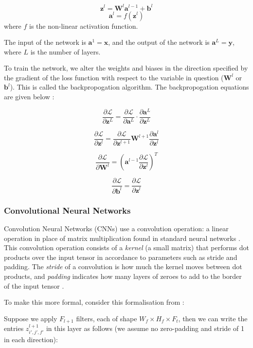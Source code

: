 \[
\boldsymbol{z}^l = \boldsymbol{W}^l \boldsymbol{a}^{l-1} + \boldsymbol{b}^l
\]
\[
\boldsymbol{a}^{l} = f(\boldsymbol{z}^{l})
\]
where $f$ is the non-linear activation function.

The input of the network is $\boldsymbol{a}^1 = \boldsymbol{x}$, and the output of the network is $\boldsymbol{a}^L = \boldsymbol{y}$, where $L$ is the number of layers.

To train the network, we alter the weights and biases in the direction specified by the gradient of the loss function with respect to the variable in question ($\boldsymbol{W}^l$ or $\boldsymbol{b}^l$). This is called the backpropogation algorithm. The backpropogation equations are given below \cite{csmlnotes}:

\[\frac{\partial \mathcal{L}}{\partial \boldsymbol{z}^L} =\frac{\partial \mathcal{L}}{\partial \boldsymbol{a}^L} \cdot \frac{\partial \boldsymbol{a}^L}{\partial \boldsymbol{z}^L}\]

\[\frac{\partial \mathcal{L}}{\partial \boldsymbol{z}^l} = \frac{\partial \mathcal{L}}{\partial \boldsymbol{z}^{l+1}} \boldsymbol{W}^{l+1} \frac{\partial \boldsymbol{a}^l}{\partial \boldsymbol{z}^{l}}\]

\[\frac{\partial \mathcal{L}}{\partial \boldsymbol{W}^l} = (\boldsymbol{a}^{l-1} \frac{\partial \mathcal{L}}{\partial \boldsymbol{z}^l} )^T\]

\[\frac{\partial \mathcal{L}}{\partial \boldsymbol{b}^l} =\frac{\partial \mathcal{L}}{\partial \boldsymbol{z}^l}\]



\subsubsection{Convolutional Neural Networks}
Convolution Neural Networks (CNNs) use a convolution operation: a linear operation in place of matrix multiplication found in standard neural networks \cite{cnn}. This convolution operation consists of a \textit{kernel} (a small matrix) that performs dot products over the input tensor in accordance to parameters such as stride and padding. The \textit{stride} of a convolution is how much the kernel moves between dot products, and \textit{padding} indicates how many layers of zeroes to add to the border of the input tensor \cite{cnn}.

To make this more formal, consider this formalisation from \cite{csmlnotes}:

Suppose we apply $F_{l+1}$ filters, each of shape $W_f \times H_f \times F_t$, then we can write the entries $z_{i',j',f'}^{l+1}$ in this layer as follows (we assume no zero-padding and stride of 1 in each direction):



